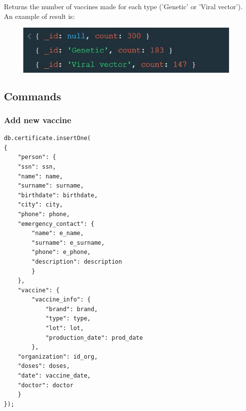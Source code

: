 \documentclass[12pt, a4paper]{article}
\begin{document}
\noindent
Returns the number of vaccines made for each type ('Genetic' or 'Viral vector').\\
An example of result is:
\begin{figure}[ht]
    \centering
    \includegraphics[width=.6\linewidth]{vaccines_per_type.jpg}
\end{figure}
\subsection{Commands}

\subsubsection{Add new vaccine} 
\begin{tcolorbox}[fontupper=\scriptsize]
    \begin{verbatim}
db.certificate.insertOne(
{ 
    "person": {
    "ssn": ssn,
    "name": name,
    "surname": surname,
    "birthdate": birthdate,
    "city": city,
    "phone": phone,
    "emergency_contact": {
        "name": e_name,
        "surname": e_surname,
        "phone": e_phone,
        "description": description
        }
    },
    "vaccine": {
        "vaccine_info": {
            "brand": brand,
            "type": type,
            "lot": lot,
            "production_date": prod_date
        },
    "organization": id_org,
    "doses": doses,
    "date": vaccine_date,
    "doctor": doctor
    }
});
    \end{verbatim}
\end{tcolorbox}
\end{document}
